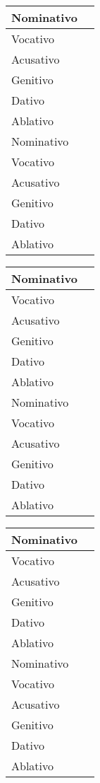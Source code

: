 \documentclass[12pt, twocolumn, a4paper, article]{article}
\numberwithin{equation}{section}
\begin{document}
\begin{table}
\centering
\begin{tabular}[!ht]{|l|p{3cm}|} %
\hline \hline
Nominativo &  \\ \hline
Vocativo   &  \\ \hline
Acusativo  &  \\ \hline
Genitivo   &  \\ \hline
Dativo     &  \\ \hline
Ablativo   &  \\
\hline
\hline
Nominativo &  \\ \hline
Vocativo   &  \\ \hline
Acusativo  &  \\ \hline
Genitivo   &  \\ \hline
Dativo     &  \\ \hline
Ablativo   &  \\
\hline \hline
\end{tabular}
\end{table}

\begin{table}
\centering
\begin{tabular}[!ht]{|l|p{3cm}|} %
\hline \hline
Nominativo &  \\ \hline
Vocativo   &  \\ \hline
Acusativo  &  \\ \hline
Genitivo   &  \\ \hline
Dativo     &  \\ \hline
Ablativo   &  \\
\hline
\hline
Nominativo &  \\ \hline
Vocativo   &  \\ \hline
Acusativo  &  \\ \hline
Genitivo   &  \\ \hline
Dativo     &  \\ \hline
Ablativo   &  \\
\hline \hline
\end{tabular}
\end{table}

\begin{table}
\centering
\begin{tabular}[!ht]{|l|p{3cm}|} %
\hline \hline
Nominativo &  \\ \hline
Vocativo   &  \\ \hline
Acusativo  &  \\ \hline
Genitivo   &  \\ \hline
Dativo     &  \\ \hline
Ablativo   &  \\
\hline
\hline
Nominativo &  \\ \hline
Vocativo   &  \\ \hline
Acusativo  &  \\ \hline
Genitivo   &  \\ \hline
Dativo     &  \\ \hline
Ablativo   &  \\
\hline \hline
\end{tabular}
\end{table}
\end{document}
